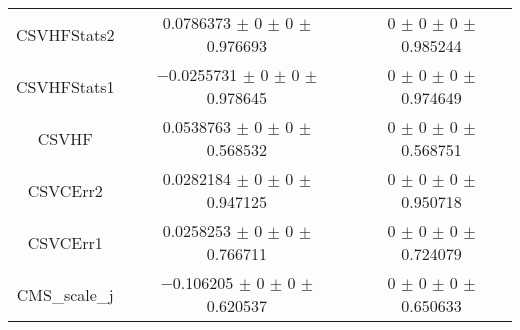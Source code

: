 \begin{table}
\begin{tabular}{ccc}
CSVHFStats2 	& \num{0.0786373} $\pm$ \num{0} $\pm$ \num{0} $\pm$ \num{0.976693} 	& \num{0} $\pm$ \num{0} $\pm$ \num{0} $\pm$ \num{0.985244}\\
CSVHFStats1 	& \num{-0.0255731} $\pm$ \num{0} $\pm$ \num{0} $\pm$ \num{0.978645} 	& \num{0} $\pm$ \num{0} $\pm$ \num{0} $\pm$ \num{0.974649}\\
CSVHF 	& \num{0.0538763} $\pm$ \num{0} $\pm$ \num{0} $\pm$ \num{0.568532} 	& \num{0} $\pm$ \num{0} $\pm$ \num{0} $\pm$ \num{0.568751}\\
CSVCErr2 	& \num{0.0282184} $\pm$ \num{0} $\pm$ \num{0} $\pm$ \num{0.947125} 	& \num{0} $\pm$ \num{0} $\pm$ \num{0} $\pm$ \num{0.950718}\\
CSVCErr1 	& \num{0.0258253} $\pm$ \num{0} $\pm$ \num{0} $\pm$ \num{0.766711} 	& \num{0} $\pm$ \num{0} $\pm$ \num{0} $\pm$ \num{0.724079}\\
CMS\_scale\_j 	& \num{-0.106205} $\pm$ \num{0} $\pm$ \num{0} $\pm$ \num{0.620537} 	& \num{0} $\pm$ \num{0} $\pm$ \num{0} $\pm$ \num{0.650633}\\
\bottomrule
\end{tabular}
\end{table}